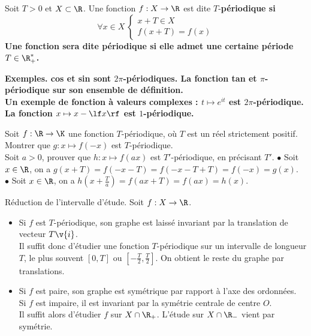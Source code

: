 \documentclass[11pt]{article}
\begin{document}
\begin{defi}{}{}
    Soit $T>0$ et $X\subset\R$. Une fonction $f:X\to\R$ est dite $T$-\bf{périodique} si
    \begin{equation*}
        \forall x \in X~\begin{cases}x+T\in X\\f(x+T)=f(x)\end{cases}
    \end{equation*}
    Une fonction sera dite \bf{périodique} si elle admet une certaine période $T\in\R_+^*$.
\end{defi}

\bf{Exemples.} cos et sin sont $2\pi$-périodiques. La fonction tan et $\pi$-périodique sur son ensemble de définition.\\
Un exemple de fonction à valeurs complexes : $t\mapsto e^{it}$ est $2\pi$-périodique.\n
La fonction $x\mapsto x-\lf x \rf$ est $1$-périodique.

\pagebreak

\begin{ex}{}{}
    Soit $f:\R\to\K$ une fonction $T$-périodique, où $T$ est un réel strictement positif.\\
    Montrer que $g:x\mapsto f(-x)$ est $T$-périodique.\\
    Soit $a>0$, prouver que $h:x\mapsto f(ax)$ est $T'$-périodique, en précisant $T'$.
    \tcblower
    $\bullet$ Soit $x\in\R$, on a $g(x+T)=f(-x-T)=f(-x-T+T)=f(-x)=g(x)$.\\
    $\bullet$ Soit $x\in\R$, on a $h(x+\frac{T}{a})=f(ax+T)=f(ax)=h(x)$.
\end{ex}

\begin{meth}{Réduction de l'intervalle d'étude.}{}
    Soit $f:X\to\R$.
    \begin{itemize}
        \item Si $f$ est $T$-périodique, son graphe est laissé invariant par la translation de vecteur $T\v{i}$.\\
        Il suffit donc d'étudier une fonction $T$-périodique sur un intervalle de longueur $T$, le plus souvent $[0,T]$ ou $[-\frac{T}{2},\frac{T}{2}]$. On obtient le reste du graphe par translations.
        \item Si $f$ est paire, son graphe est symétrique par rapport à l'axe des ordonnées.\\
        Si $f$ est impaire, il est invariant par la symétrie centrale de centre $O$.\\
        Il suffit alors d'étudier $f$ sur $X\cap\R_+$. L'étude sur $X\cap\R_-$ vient par symétrie. 
    \end{itemize}
\end{meth}
\end{document}
